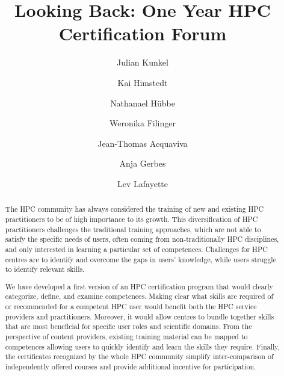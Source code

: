 \documentclass[jocse]{jocseart}
\begin{document}
\title{Looking Back: One Year HPC Certification Forum}

\author{Julian Kunkel}


\author{Kai Himstedt}
\author{Nathanael Hübbe}

\author{Weronika Filinger}

\author{Jean-Thomas Acquaviva}


\author{Anja Gerbes}

\author{Lev Lafayette}

\renewcommand{\shortauthors}{J. Kunkel et al.}


\begin{abstract}
  The HPC community has always considered the training of new and existing HPC practitioners to be of high importance to its growth.
  This diversification of HPC practitioners challenges the traditional training approaches, which are not able to satisfy the specific needs of users, often coming from non-traditionally HPC disciplines, and only interested in learning a particular set of competences.
  Challenges for HPC centres are to identify and overcome the gaps in users’ knowledge, while users struggle to identify relevant skills.

  We have developed a first version of an HPC certification program that would clearly categorize, define, and examine competences.
  Making clear what skills are required of or recommended for a competent HPC user would benefit both the HPC service providers and practitioners.
  Moreover, it would allow centres to bundle together skills that are most beneficial for specific user roles and scientific domains.
  From the perspective of content providers, existing training material can be mapped to competences allowing users to quickly identify and learn the skills they require.
  Finally, the certificates recognized by the whole HPC community simplify inter-comparison of independently offered courses and provide additional incentive for participation.
\end{abstract}
\end{document}
